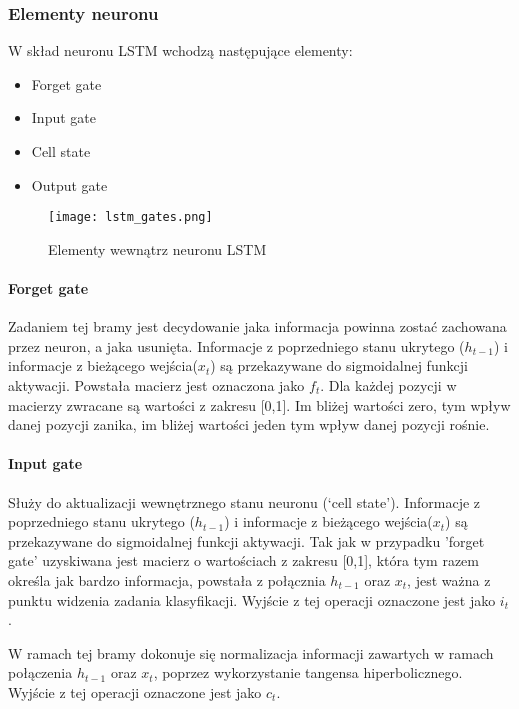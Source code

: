 \subsubsection{Elementy neuronu}

W skład neuronu LSTM wchodzą następujące elementy:
\begin{itemize}
    \item Forget gate
    \item Input gate
    \item Cell state
    \item Output gate
\end{itemize}

\begin{figure}[!h]
    \label{fig:lstm_gates}
    \centering \texttt{[image: lstm\_gates.png]}
    \caption{Elementy wewnątrz neuronu LSTM \cite{LSTM_1}}
\end{figure}

\paragraph{Forget gate}  \hfill

Zadaniem tej bramy jest decydowanie jaka informacja powinna zostać zachowana przez neuron, a jaka usunięta. Informacje z poprzedniego stanu ukrytego ($h_{t-1}$) i informacje z bieżącego wejścia($x_t$) są przekazywane do sigmoidalnej funkcji aktywacji. Powstała macierz jest oznaczona jako $f_t$. Dla każdej pozycji w macierzy zwracane są wartości z zakresu [0,1]. Im bliżej wartości zero, tym wpływ danej pozycji zanika, im bliżej wartości jeden tym wpływ danej pozycji rośnie.


\paragraph{Input gate}  \hfill

Służy do aktualizacji wewnętrznego stanu neuronu (‘cell state’). Informacje z poprzedniego stanu ukrytego ($h_{t-1}$) i informacje z bieżącego wejścia($x_t$) są przekazywane do sigmoidalnej funkcji aktywacji. Tak jak w przypadku 'forget gate’ uzyskiwana jest macierz o wartościach z zakresu [0,1], która tym razem określa jak bardzo informacja, powstała z połącznia $h_{t-1}$ oraz $x_t$, jest ważna z punktu widzenia zadania klasyfikacji. Wyjście z tej operacji oznaczone jest jako $i_t$.

W ramach tej bramy dokonuje się normalizacja informacji zawartych w ramach połączenia $h_{t-1}$ oraz $x_t$, poprzez wykorzystanie tangensa hiperbolicznego. Wyjście z tej operacji oznaczone jest jako $c_t$.


